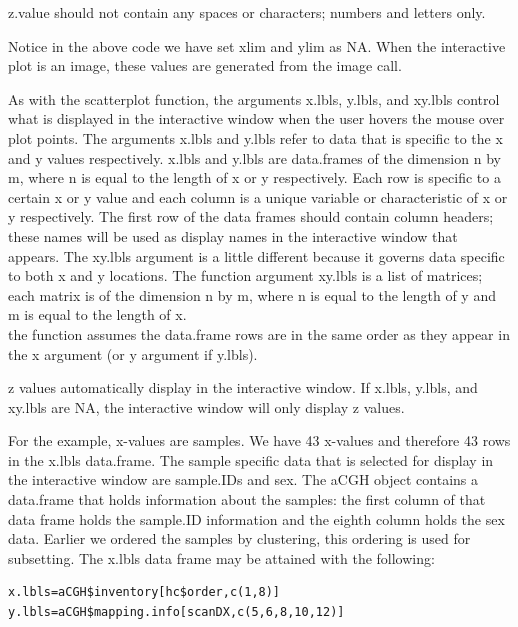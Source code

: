 \documentclass[]{article}
\begin{document}
 z.value should not contain any spaces or characters; numbers and letters only. \newline

\indent Notice in the above code we have set xlim and ylim as NA. When the interactive plot is an image, these values are generated from the image call. 

\indent As with the scatterplot function, the arguments x.lbls, y.lbls, and xy.lbls control what is displayed in the interactive window when the user hovers the mouse over plot points. The arguments x.lbls and y.lbls refer to data that is specific to the x and y values respectively. x.lbls and y.lbls are data.frames of the dimension n by m, where n is equal to the length of x or y respectively. Each row is specific to a certain x or y value and each column is a unique variable or characteristic of x or y respectively.  The first row of the data frames should contain column headers; these names will be used as display names in the interactive window that appears. The xy.lbls argument is a little different because it governs data specific to both x and y locations. The function argument xy.lbls is a list of matrices; each matrix is of the dimension n by m, where n is equal to the length of y and m is equal to the length of x.\\ 

 the function assumes the data.frame rows are in the same order as they appear in the x argument (or y argument if y.lbls).  \newline

 z values automatically display in the interactive window. If x.lbls, y.lbls, and xy.lbls are NA, the interactive window will only display z values. \newline 

\indent For the example, x-values are samples. We have 43 x-values and therefore 43 rows in the x.lbls data.frame. The sample specific data that is selected for display in the interactive window are sample.IDs and sex. The aCGH object contains a data.frame that holds information about the samples: the first column of that data frame holds the sample.ID information and the eighth column holds the sex data. Earlier we ordered the samples by clustering, this ordering is used for subsetting. The x.lbls data frame may be attained with the following:

\begin{verbatim}
x.lbls=aCGH$inventory[hc$order,c(1,8)]
y.lbls=aCGH$mapping.info[scanDX,c(5,6,8,10,12)]
\end{verbatim}
\end{document}
